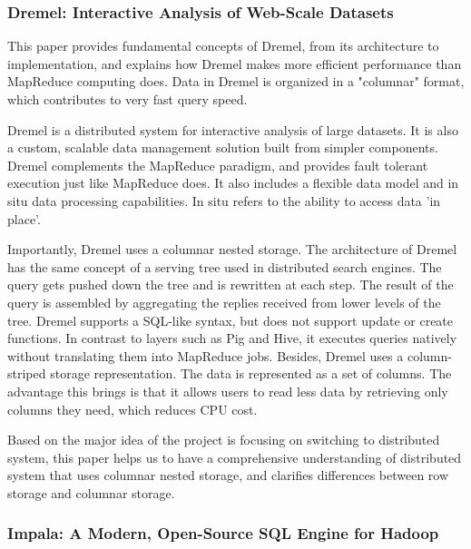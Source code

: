 \documentclass[onecolumn, draftclsnofoot,10pt, compsoc]{IEEEtran}
\begin{document}
\subsubsection{Dremel: Interactive Analysis of Web-Scale Datasets}

This paper provides fundamental concepts of Dremel, from its architecture to implementation, and explains how Dremel makes more efficient performance than MapReduce computing does.
Data in Dremel is organized in a "columnar" format, which contributes to very fast query speed.

Dremel is a distributed system for interactive analysis of large datasets. It is also a custom, scalable data management solution built from simpler components. Dremel complements the MapReduce paradigm, and provides fault tolerant execution just like MapReduce does.
It also includes a flexible data model and in situ data processing capabilities.
In situ refers to the ability to access data 'in place'. 

Importantly, Dremel uses a columnar nested storage.
The architecture of Dremel has the same concept of a serving tree used in distributed search engines.
The query gets pushed down the tree and is rewritten at each step. 
The result of the query is assembled by aggregating the replies received from lower levels of the tree.
Dremel supports a SQL-like syntax, but does not support update or create functions. 
In contrast to layers such as Pig and Hive, it executes queries natively without translating them into MapReduce jobs.
Besides, Dremel uses a column-striped storage representation. 
The data is represented as a set of columns. 
The advantage this brings is that it allows users to read less data by retrieving only columns they need, which reduces CPU cost.

Based on the major idea of the project is focusing on switching to distributed system, this paper helps us to have a comprehensive understanding of distributed system that uses columnar nested storage, and clarifies differences between row storage and columnar storage.

\subsubsection{Impala: A Modern, Open-Source SQL Engine for Hadoop}
\end{document}
